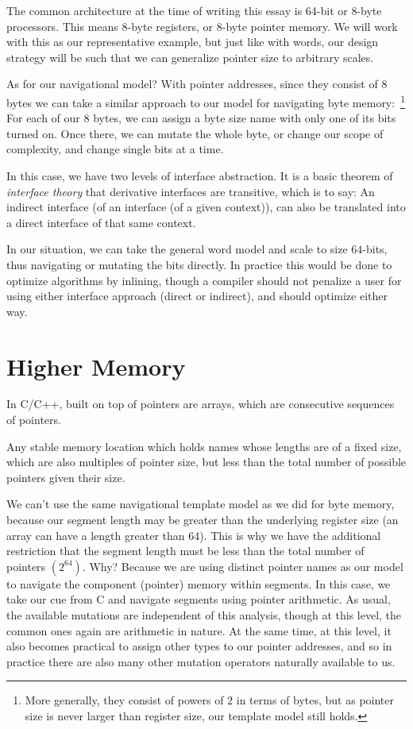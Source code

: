 \documentclass[twoside]{article}
\newenvironment{definition}[1][Definition]{\begin{trivlist}
\item[\hskip \labelsep {\bfseries #1:}]}{\end{trivlist}}
\begin{document}
The common architecture at the time of writing this essay is 64-bit or 8-byte processors. This means 8-byte registers,
or 8-byte pointer memory. We will work with this as our representative example, but just like with words, our design
strategy will be such that we can generalize pointer size to arbitrary scales.

As for our navigational model? With pointer addresses, since they consist of 8 bytes we can take a similar approach
to our model for navigating byte memory:~\footnote{More generally, they consist of powers of $ 2 $ in terms of bytes,
but as pointer size is never larger than register size, our template model still holds.} For each of our 8 bytes,
we can assign a byte size name with only one of its bits turned on. Once there, we can mutate the whole byte,
or change our scope of complexity, and change single bits at a time.

In this case, we have two levels of interface abstraction. It is a basic theorem of \emph{interface theory}
that derivative interfaces are transitive, which is to say: An indirect interface (of an interface (of a given context)),
can also be translated into a direct interface of that same context.

In our situation, we can take the general word model and scale to size $ 64 $-bits, thus navigating or mutating
the bits directly. In practice this would be done to optimize algorithms by inlining, though a compiler should
not penalize a user for using either interface approach (direct or indirect), and should optimize either way.

\section*{Higher Memory}

In C/C++, built on top of pointers are arrays, which are consecutive sequences of pointers.

\begin{definition}[Segment Memory]
Any stable memory location which holds names whose lengths are of a fixed size, which are also multiples of pointer size,
but less than the total number of possible pointers given their size.
\end{definition}

We can't use the same navigational template model as we did for byte memory, because our segment length may be greater
than the underlying register size (an array can have a length greater than 64). This is why we have the additional restriction
that the segment length must be less than the total number of pointers $ (2^{64}) $. Why? Because we are using distinct pointer
names as our model to navigate the component (pointer) memory within segments. In this case, we take our cue from C and navigate
segments using pointer arithmetic. As usual, the available mutations are independent of this analysis, though at this level,
the common ones again are arithmetic in nature. At the same time, at this level, it also becomes practical to assign other types
to our pointer addresses, and so in practice there are also many other mutation operators naturally available to us.
\end{document}

